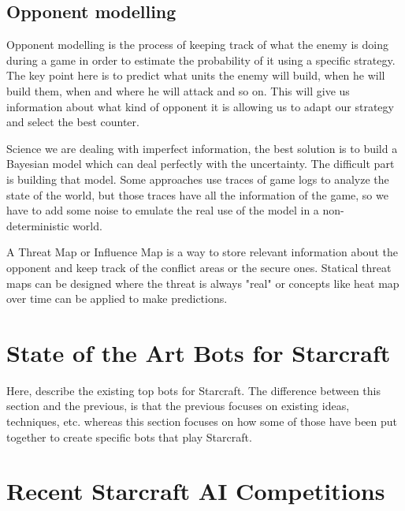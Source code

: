 \documentclass[journal]{IEEEtran}
\begin{document}
\subsection{Opponent modelling}
{\color{ForestGreen}
Opponent modelling is the process of keeping track of what the enemy is doing during a game in order to estimate the probability of it using a specific strategy. The key point here is to predict what units the enemy will build, when he will build them, when and where he will attack and so on. This will give us information about what kind of opponent it is allowing us to adapt our strategy and select the best counter.

Science we are dealing with imperfect information, the best solution is to build a Bayesian model which can deal perfectly with the uncertainty. The difficult part is building that model. Some approaches use traces of game logs to analyze the state of the world, but those traces have all the information of the game, so we have to add some noise to emulate the real use of the model in a non-deterministic world.

A Threat Map or Influence Map is a way to store relevant information about the opponent and keep track of the conflict areas or the secure ones. Statical threat maps can be designed where the threat is always "real" or concepts like heat map over time can be applied to make predictions.
}


\section{State of the Art Bots for Starcraft}\label{sec:bot}

{\color{blue}
Here, describe the existing top bots for Starcraft. The difference between this section and the previous, is that the previous focuses on existing ideas, techniques, etc. whereas this section focuses on how some of those have been put together to create specific bots that play Starcraft.
}


\section{Recent Starcraft AI Competitions}\label{sec:competition}
\end{document}

